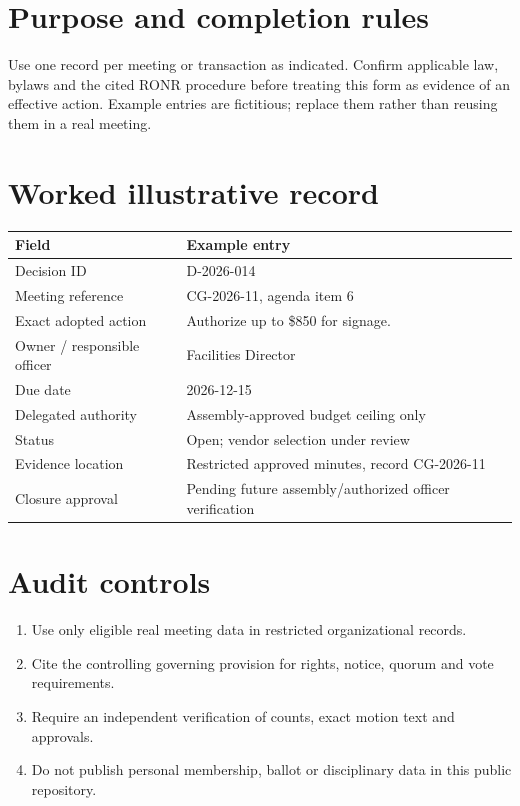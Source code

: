 \documentclass[11pt]{article}
\begin{document}
\SuiteOpen
\section{Purpose and completion rules}
Use one record per meeting or transaction as indicated. Confirm applicable law, bylaws and the cited RONR procedure before treating this form as evidence of an effective action. Example entries are fictitious; replace them rather than reusing them in a real meeting.

\section{Worked illustrative record}
\begin{longtable}{@{}p{.38\linewidth}p{.55\linewidth}@{}}\toprule Field & Example entry\\\midrule\endhead


Decision ID & D-2026-014\\
Meeting reference & CG-2026-11, agenda item 6\\
Exact adopted action & Authorize up to \$850 for signage.\\
Owner / responsible officer & Facilities Director\\
Due date & 2026-12-15\\
Delegated authority & Assembly-approved budget ceiling only\\
Status & Open; vendor selection under review\\
Evidence location & Restricted approved minutes, record CG-2026-11\\
Closure approval & Pending future assembly/authorized officer verification\\
\bottomrule\end{longtable}
\section{Audit controls}
\begin{enumerate}[leftmargin=*,itemsep=4pt]
\item Use only eligible real meeting data in restricted organizational records.
\item Cite the controlling governing provision for rights, notice, quorum and vote requirements.
\item Require an independent verification of counts, exact motion text and approvals.
\item Do not publish personal membership, ballot or disciplinary data in this public repository.
\end{enumerate}
\end{document}
